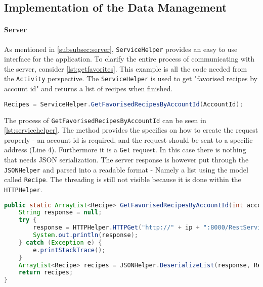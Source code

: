 \subsection{Implementation of the Data Management}
\label{subsec:datamanagement}


\paragraph{Server}
As mentioned in \ref{subsubsec:server}, \texttt{ServiceHelper} provides an easy to use interface for the application. To clarify the entire process of communicating with the server, consider \ref{lst:getfavorites}. This example is all the code needed from the \texttt{Activity} perspective. The \texttt{ServiceHelper} is used to get "favorised recipes by account id" and returns a list of recipes when finished.

\begin{lstlisting}[language=java, label={lst:getfavorites}, caption={Sending a server request from an Activity}]
Recipes = ServiceHelper.GetFavorisedRecipesByAccountId(AccountId);
\end{lstlisting}

The process of \texttt{GetFavorisedRecipesByAccountId} can be seen in \ref{lst:servicehelper}. The method provides the specifics on how to create the request properly - an account id is required, and the request should be sent to a specific address (Line 4). Furthermore it is a \texttt{Get} request.
In this case there is nothing that needs JSON serialization. The server response is however put through the \texttt{JSONHelper} and parsed into a readable format - Namely a list using the model called \texttt{Recipe}. The threading is still not visible because it is done within the \texttt{HTTPHelper}.

\begin{lstlisting}[language=java, label={lst:servicehelper}, caption={GetFavorisedRecipesByAccountId from ServiceHelper}]
public static ArrayList<Recipe> GetFavorisedRecipesByAccountId(int accountId){
    String response = null;
    try {
        response = HTTPHelper.HTTPGet("http://" + ip + ":8000/RestService/Favorises/GetFavorisedRecipesByAccountId?accountId=" + accountId);
        System.out.println(response);
    } catch (Exception e) {
        e.printStackTrace();
    }
    ArrayList<Recipe> recipes = JSONHelper.DeserializeList(response, Recipe.class);
    return recipes;
}
\end{lstlisting}